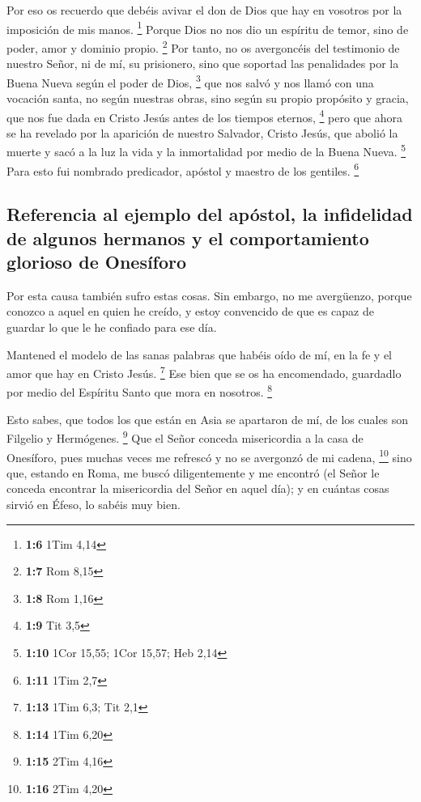 \begin{paracol}{2}
 Por eso os recuerdo que debéis avivar el don de Dios que
hay en vosotros por la imposición de mis manos. \footnote{\textbf{1:6}
  1Tim 4,14}  Porque Dios no nos dio un espíritu de temor,
sino de poder, amor y dominio propio. \footnote{\textbf{1:7} Rom 8,15}
 Por tanto, no os avergoncéis del testimonio de nuestro
Señor, ni de mí, su prisionero, sino que soportad las penalidades por la
Buena Nueva según el poder de Dios, \footnote{\textbf{1:8} Rom 1,16}
 que nos salvó y nos llamó con una vocación santa, no
según nuestras obras, sino según su propio propósito y gracia, que nos
fue dada en Cristo Jesús antes de los tiempos eternos, \footnote{\textbf{1:9}
  Tit 3,5}  pero que ahora se ha revelado por la
aparición de nuestro Salvador, Cristo Jesús, que abolió la muerte y sacó
a la luz la vida y la inmortalidad por medio de la Buena Nueva.
\footnote{\textbf{1:10} 1Cor 15,55; 1Cor 15,57; Heb 2,14}
 Para esto fui nombrado predicador, apóstol y maestro de
los gentiles. \footnote{\textbf{1:11} 1Tim 2,7}

\hypertarget{referencia-al-ejemplo-del-apuxf3stol-la-infidelidad-de-algunos-hermanos-y-el-comportamiento-glorioso-de-onesuxedforo}{%
\subsection{Referencia al ejemplo del apóstol, la infidelidad de algunos
hermanos y el comportamiento glorioso de
Onesíforo}\label{referencia-al-ejemplo-del-apuxf3stol-la-infidelidad-de-algunos-hermanos-y-el-comportamiento-glorioso-de-onesuxedforo}}

 Por esta causa también sufro estas cosas. Sin embargo,
no me avergüenzo, porque conozco a aquel en quien he creído, y estoy
convencido de que es capaz de guardar lo que le he confiado para ese
día.

 Mantened el modelo de las sanas palabras que habéis oído
de mí, en la fe y el amor que hay en Cristo Jesús. \footnote{\textbf{1:13}
  1Tim 6,3; Tit 2,1}  Ese bien que se os ha encomendado,
guardadlo por medio del Espíritu Santo que mora en nosotros. \footnote{\textbf{1:14}
  1Tim 6,20}

 Esto sabes, que todos los que están en Asia se apartaron
de mí, de los cuales son Filgelio y Hermógenes. \footnote{\textbf{1:15}
  2Tim 4,16}  Que el Señor conceda misericordia a la casa
de Onesíforo, pues muchas veces me refrescó y no se avergonzó de mi
cadena, \footnote{\textbf{1:16} 2Tim 4,20}  sino que,
estando en Roma, me buscó diligentemente y me encontró 
(el Señor le conceda encontrar la misericordia del Señor en aquel día);
y en cuántas cosas sirvió en Éfeso, lo sabéis muy bien.


\end{paracol}
